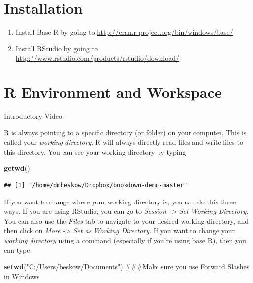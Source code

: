 \documentclass[]{book}
\newenvironment{Shaded}{\begin{snugshade}}{\end{snugshade}}
\newcommand{\KeywordTok}[1]{\textcolor[rgb]{0.13,0.29,0.53}{\textbf{{#1}}}}
\newcommand{\StringTok}[1]{\textcolor[rgb]{0.31,0.60,0.02}{{#1}}}
\newcommand{\NormalTok}[1]{{#1}}
\providecommand{\tightlist}{%
  \setlength{\itemsep}{0pt}\setlength{\parskip}{0pt}}
\begin{document}
\section{Installation}\label{installation}

\begin{enumerate}
\def\labelenumi{\arabic{enumi}.}
\tightlist
\item
  Install Base R by going to
  \url{http://cran.r-project.org/bin/windows/base/}
\item
  Install RStudio by going to
  \url{http://www.rstudio.com/products/rstudio/download/}
\end{enumerate}

\section{R Environment and Workspace}\label{r-environment-and-workspace}

Introductory Video:

R is always pointing to a specific directory (or folder) on your
computer. This is called your \emph{working directory}. R will always
directly read files and write files to this directory. You can see your
working directory by typing

\begin{Shaded}
\begin{Highlighting}[]
\KeywordTok{getwd}\NormalTok{()}
\end{Highlighting}
\end{Shaded}

\begin{verbatim}
## [1] "/home/dmbeskow/Dropbox/bookdown-demo-master"
\end{verbatim}

If you want to change where your working directory is, you can do this
three ways. If you are using RStudio, you can go to \emph{Session
-\textgreater{} Set Working Directory}. You can also use the
\emph{Files} tab to navigate to your desired working directory, and then
click on \emph{More -\textgreater{} Set as Working Directory}. If you
want to change your \emph{working directory} using a command (especially
if you're using base R), then you can type

\begin{Shaded}
\begin{Highlighting}[]
\KeywordTok{setwd}\NormalTok{(}\StringTok{"C:/Users/beskow/Documents"}\NormalTok{)  ###Make sure you use Forward Slashes in Windows}
\end{Highlighting}
\end{Shaded}
\end{document}
